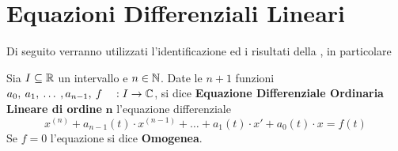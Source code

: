 \newpage
\cbstart
\section{Equazioni Differenziali Lineari}
Di seguito verranno utilizzati l'identificazione ed i risultati della , in particolare 
\begin{definition}
	Sia $I \subseteq \mathbb{R}$ un intervallo e $n \in \mathbb{N}$. Date le $n + 1$ funzioni $a_0,\:a_1,\:\dotsc\:,a_{n-1},\:f \quad : I \to \mathbb{C}$, si dice \textbf{Equazione Differenziale Ordinaria Lineare di ordine} $\boldsymbol{n}$ l'equazione differenziale
	\[x^{(n)} + a_{n-1}(t) \cdot x^{(n-1)} + \dotsc + a_{1}(t) \cdot x' + a_{0}(t) \cdot x = f(t)\]
	Se $f = 0$ l'equazione si dice \textbf{Omogenea}.
\end{definition}
